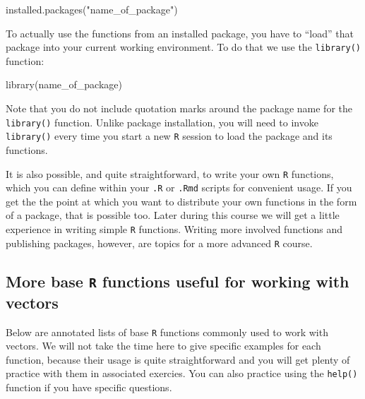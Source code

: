 \documentclass[
]{book}
\newenvironment{Shaded}{\begin{snugshade}}{\end{snugshade}}
\newcommand{\FunctionTok}[1]{\textcolor[rgb]{0.00,0.00,0.00}{#1}}
\newcommand{\NormalTok}[1]{#1}
\newcommand{\StringTok}[1]{\textcolor[rgb]{0.31,0.60,0.02}{#1}}
\begin{document}
\begin{Shaded}
\begin{Highlighting}[]
\FunctionTok{installed.packages}\NormalTok{(}\StringTok{"name\_of\_package"}\NormalTok{)}
\end{Highlighting}
\end{Shaded}

To actually use the functions from an installed package, you have to ``load'' that package into your current working environment. To do that we use the \texttt{library()} function:

\begin{Shaded}
\begin{Highlighting}[]
\FunctionTok{library}\NormalTok{(name\_of\_package)}
\end{Highlighting}
\end{Shaded}

Note that you do not include quotation marks around the package name for the \texttt{library()} function. Unlike package installation, you will need to invoke \texttt{library()} every time you start a new \texttt{R} session to load the package and its functions.

It is also possible, and quite straightforward, to write your own \texttt{R} functions, which you can define within your \texttt{.R} or \texttt{.Rmd} scripts for convenient usage. If you get the the point at which you want to distribute your own functions in the form of a package, that is possible too. Later during this course we will get a little experience in writing simple \texttt{R} functions. Writing more involved functions and publishing packages, however, are topics for a more advanced \texttt{R} course.

\hypertarget{more-base-r-functions-useful-for-working-with-vectors}{%
\subsection{\texorpdfstring{More base \texttt{R} functions useful for working with vectors}{More base R functions useful for working with vectors}}\label{more-base-r-functions-useful-for-working-with-vectors}}

Below are annotated lists of base \texttt{R} functions commonly used to work with vectors. We will not take the time here to give specific examples for each function, because their usage is quite straightforward and you will get plenty of practice with them in associated exercies. You can also practice using the \texttt{help()} function if you have specific questions.
\end{document}
